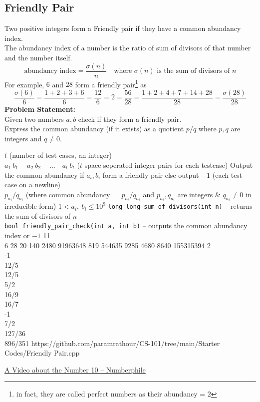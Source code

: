 \documentclass[../../Problems]{subfiles}
\begin{document}
\subsection{Friendly Pair}{\label{pp:friendlypair}}
Two positive integers form a Friendly pair if they have a common abundancy index.\\
The abundancy index of a number is the ratio of sum of divisors of that number and the number itself.
\begin{equation}
\text{abundancy index} = \frac{\sigma(n)}{n}\quad\text{where $\sigma(n)$ is the sum of divisors of $n$}
\end{equation}
For example, $6$ and $28$ form a friendly pair\footnote{in fact, they are called perfect numbers as their abundancy = $2$} as
\begin{equation*}
{\displaystyle {\dfrac {\sigma (6)}{6}}={\dfrac {1+2+3+6}{6}}={\dfrac {12}{6}}=2={\dfrac {56}{28}}={\dfrac {1+2+4+7+14+28}{28}}= {\dfrac {\sigma (28)}{28}}}
\end{equation*} 
\textbf{Problem Statement:}\\
Given two numbers $a,b$ check if they form a friendly pair.\\
Express the common abundancy (if it exists) as a quotient $p/q$ where $p,q$ are integers and $q\neq0$.
\begin{testcasesFunction}
	{$t$ \hfill(number of test cases, an integer)\\
	$a_1\ b_1\ \quad a_2\ b_2\ \quad \ldots\quad a_t\ b_t$ \hfill($t$ space seperated integer pairs for each testcase)}
	{Output the common abundancy if $a_i,b_i$ form a friendly pair else output $-1$ \hfill(each test case on a newline)\\
	$p_{a_i}/q_{a_i}$ \hfill(where common abundancy $ = p_{a_i}/q_{a_i}$ and $p_{a_i},q_{a_i}$ are integers \& $q_{a_i}\neq0$ in irreducible form)}
	{$1 < a_i,\ b_i \leq 10^{9}$}
	{\texttt{long long sum\_of\_divisors(int n)} -- returns the sum of divisors of $n$\\
	\texttt{bool friendly\_pair\_check(int a, int b)} -- outputs the common abundancy index or $-1$}
	{11\\6 28 20 140 2480 91963648 819 544635 9285 4680 8640 155315394}
	{2\\-1\\12/5\\12/5\\5/2\\16/9\\16/7\\-1\\7/2\\127/36\\896/351}
	{https://github.com/paramrathour/CS-101/tree/main/Starter Codes/Friendly Pair.cpp}
\end{testcasesFunction}
\begin{funvideo}
\href{https://youtu.be/KZ1BVlURwfI}{A Video about the Number 10 -- Numberphile}
\end{funvideo}
\end{document}
